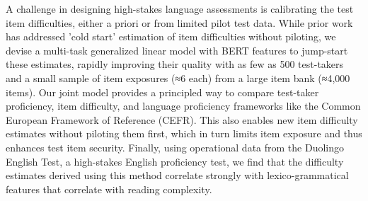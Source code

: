 A challenge in designing high-stakes language assessments is calibrating the test item difficulties, either a priori or from limited pilot test data. While prior work has addressed 'cold start' estimation of item difficulties without piloting, we devise a multi-task generalized linear model with BERT features to jump-start these estimates, rapidly improving their quality with as few as 500 test-takers and a small sample of item exposures (≈6 each) from a large item bank (≈4,000 items). Our joint model provides a principled way to compare test-taker proficiency, item difficulty, and language proficiency frameworks like the Common European Framework of Reference (CEFR). This also enables new item difficulty estimates without piloting them first, which in turn limits item exposure and thus enhances test item security. Finally, using operational data from the Duolingo English Test, a high-stakes English proficiency test, we find that the difficulty estimates derived using this method correlate strongly with lexico-grammatical features that correlate with reading complexity.
